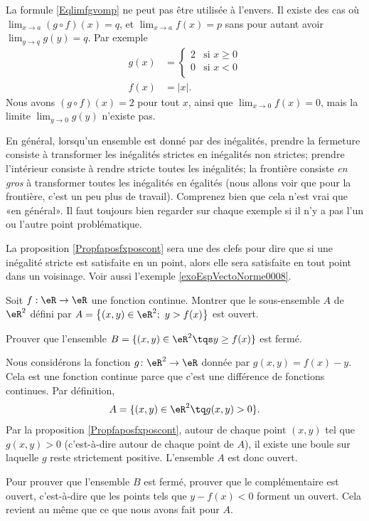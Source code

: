 \begin{remark}
	La formule \eqref{Eqlimfgvomp} ne peut pas être utilisée à l'envers. Il existe des cas où \( \lim_{x\to a} (g\circ f)(x)=q\), et \( \lim_{x\to a} f(x)=p\) sans pour autant avoir \( \lim_{y\to q} g(y)=q\). Par exemple
	\begin{subequations}
		\begin{align}
			g(x) & =\begin{cases}
				        2 & \text{si }x\geq0 \\
				        0 & \text{si }x<0    \\
			        \end{cases} \\
			f(x) & =| x |.
		\end{align}
	\end{subequations}
	Nous avons \( (g\circ f)(x)=2\) pour tout \( x\), ainsi que \( \lim_{x\to 0} f(x)=0\), mais la limite \( \lim_{y\to 0} g(y)\) n'existe pas.
\end{remark}

En général, lorsqu'un ensemble est donné par des inégalités, prendre la fermeture consiste à transformer les inégalités strictes en inégalités non strictes; prendre l'intérieur consiste à rendre stricte toutes les inégalités; la frontière consiste \emph{en gros} à transformer toutes les inégalités en égalités (nous allons voir que pour la frontière, c'est un peu plus de travail). Comprenez bien que cela n'est vrai que «en général». Il faut toujours bien regarder sur chaque exemple si il n'y a pas l'un ou l'autre point problématique.

La proposition \ref{Propfaposfxposcont} sera une des clefs pour dire que si une inégalité stricte est satisfaite en un point, alors elle sera satisfaite en tout point dans un voisinage.
Voir aussi l'exemple \ref{exoEspVectoNorme0008}.

\begin{example}     \label{exoEspVectoNorme0008}
	Soit \( f : \eR \to \eR\) une fonction continue. Montrer que le sous-ensemble \( A\) de \( \eR ^2\) défini par \( A = \left\{ (x,y) \in \eR ^2; \ y>f(x) \right\}\) est ouvert.

	Prouver que l'ensemble \( B=\{ (x,y)\in\eR^2\tqs y\geq f(x) \}\) est fermé.

	Nous considérons la fonction \( g\colon \eR^2\to \eR\) donnée par \( g(x,y)=f(x)-y\). Cela est une fonction continue parce que c'est une différence de fonctions continues. Par définition,
	\begin{equation}
		A=\{ (x,y)\in\eR^2\tq g(x,y)>0 \}.
	\end{equation}
	Par la proposition \ref{Propfaposfxposcont}, autour de chaque point \( (x,y)\) tel que \( g(x,y)>0\) (c'est-à-dire autour de chaque point de \( A\)), il existe une boule sur laquelle \( g\) reste strictement positive. L'ensemble \( A\) est donc ouvert.

	Pour prouver que l'ensemble \( B\) est fermé, prouver que le complémentaire est ouvert, c'est-à-dire que les points tels que \( y-f(x)<0\) forment un ouvert. Cela revient au même que ce que nous avons fait pour \( A\).

\end{example}

